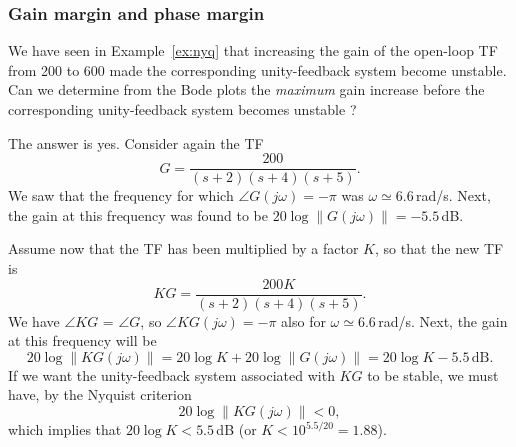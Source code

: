 \documentclass[a4paper,11pt]{report}
\theoremstyle{definition}
\begin{document}




\subsubsection{Gain margin and phase margin}

We have seen in Example~\ref{ex:nyq} that increasing the gain of the
open-loop TF from 200 to 600 made the corresponding unity-feedback
system become unstable. Can we determine from the Bode plots the
\emph{maximum} gain increase before the corresponding unity-feedback
system becomes unstable ?

The answer is yes. Consider again the TF
\[
G=\frac{200}{(s+2)(s+4)(s+5)}.
\]
We saw that the frequency for which $\angle G(j\omega) = -\pi$ was
$\omega\simeq 6.6$\,rad/s. Next, the gain at this frequency was found
to be $20\log\|G(j\omega)\|=-5.5$\,dB.

Assume now that the TF has been multiplied by a factor $K$, so that
the new TF is
\[
KG = \frac{200K}{(s+2)(s+4)(s+5)}.
\]
We have $\angle KG$ = $\angle G$, so $\angle KG(j\omega) = -\pi$ also for
$\omega\simeq 6.6$\,rad/s. Next, the gain at this frequency will be
\[
20\log\|KG(j\omega)\| = 20\log K + 20\log\|G(j\omega)\|= 20\log K -5.5\,\mathrm{dB}.
\]
If we want the unity-feedback system associated with $KG$
to be stable, we must have, by the Nyquist criterion
\[
20\log\|KG(j\omega)\| < 0,
\]
which implies that $20\log K<5.5$\,dB (or $K< 10^{5.5/20}=1.88$).
\end{document}
